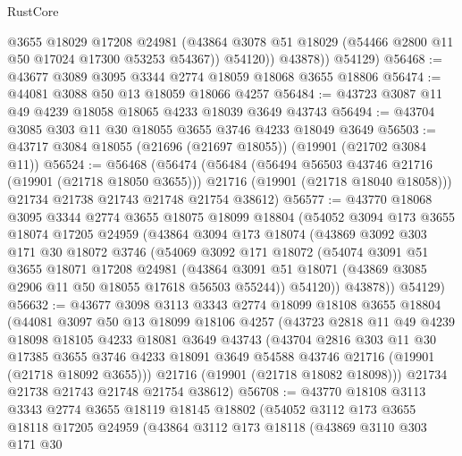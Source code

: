\begin{lexlean}{RustCore}
\begin{coremodule}
              @3655
              @18029
              @17208
              @24981
              (@43864 @3078 @51 @18029 (@54466 @2800 @11 @50 @17024 @17300 @53253 @54367))
              @54120))
          @43878))
      @54129)
@56468 := @43677 @3089 @3095 @3344 @2774 @18059 @18068 @3655 @18806
@56474 := @44081 @3088 @50 @13 @18059 @18066 @4257
@56484 := @43723 @3087 @11 @49 @4239 @18058 @18065 @4233 @18039 @3649 @43743
@56494 := @43704 @3085 @303 @11 @30 @18055 @3655 @3746 @4233 @18049 @3649
@56503 := @43717 @3084 @18055 (@21696 (@21697 @18055)) (@19901 (@21702 @3084 @11))
@56524 := @56468
    (@56474
      (@56484
        (@56494 @56503 @43746 @21716 (@19901 (@21718 @18050 @3655)))
        @21716
        (@19901 (@21718 @18040 @18058)))
      @21734
      @21738
      @21743
      @21748
      @21754
      @38612)
@56577 := @43770
    @18068
    @3095
    @3344
    @2774
    @3655
    @18075
    @18099
    @18804
    (@54052
      @3094
      @173
      @3655
      @18074
      @17205
      @24959
      (@43864
        @3094
        @173
        @18074
        (@43869
          @3092
          @303
          @171
          @30
          @18072
          @3746
          (@54069
            @3092
            @171
            @18072
            (@54074
              @3091
              @51
              @3655
              @18071
              @17208
              @24981
              (@43864 @3091 @51 @18071 (@43869 @3085 @2906 @11 @50 @18055 @17618 @56503 @55244))
              @54120))
          @43878))
      @54129)
@56632 := @43677
    @3098
    @3113
    @3343
    @2774
    @18099
    @18108
    @3655
    @18804
    (@44081
      @3097
      @50
      @13
      @18099
      @18106
      @4257
      (@43723
        @2818
        @11
        @49
        @4239
        @18098
        @18105
        @4233
        @18081
        @3649
        @43743
        (@43704
          @2816
          @303
          @11
          @30
          @17385
          @3655
          @3746
          @4233
          @18091
          @3649
          @54588
          @43746
          @21716
          (@19901 (@21718 @18092 @3655)))
        @21716
        (@19901 (@21718 @18082 @18098)))
      @21734
      @21738
      @21743
      @21748
      @21754
      @38612)
@56708 := @43770
    @18108
    @3113
    @3343
    @2774
    @3655
    @18119
    @18145
    @18802
    (@54052
      @3112
      @173
      @3655
      @18118
      @17205
      @24959
      (@43864
        @3112
        @173
        @18118
        (@43869
          @3110
          @303
          @171
          @30

\end{coremodule}
\end{lexlean}
